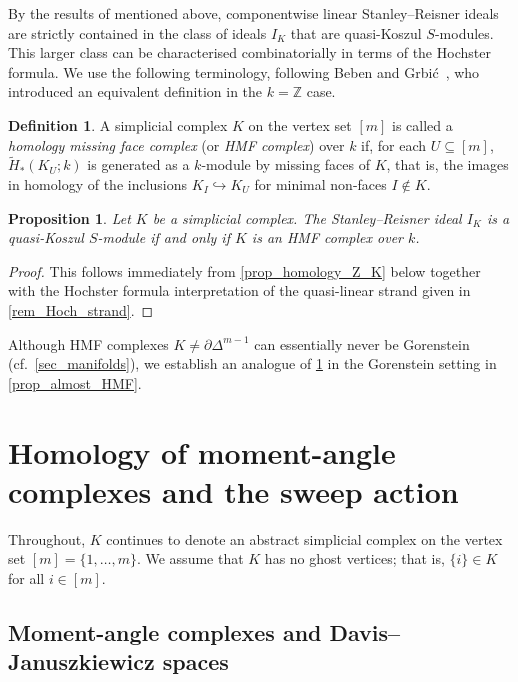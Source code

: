 \documentclass[a4paper,10pt]{amsart}
\newtheorem{proposition}[theorem]{Proposition}
\theoremstyle{definition}
\newtheorem{definition}[theorem]{Definition}
\theoremstyle{remark}
\begin{document}
By the results of \cite{CS} mentioned above, componentwise linear Stanley--Reisner ideals are strictly contained in the class of ideals $I_K$ that are quasi-Koszul $S$-modules. This larger class can be characterised combinatorially in terms of the Hochster formula. We use the following terminology, following Beben and Grbi\'c~\cite{BG}, who introduced an equivalent definition in the $k=\mathbb{Z}$ case.

\begin{definition} \label{def_HMF}
A simplicial complex $K$ on the vertex set $[m]$ is called a \emph{homology missing face complex} (or \emph{HMF complex}) over $k$ if, for each $U\subseteq[m]$, $\widetilde{H}_*(K_U;k)$ is generated as a $k$-module by missing faces of $K$, that is, the images in homology of the inclusions $K_I \hookrightarrow K_U$ for minimal non-faces $I\notin K$.  
\end{definition}

\begin{proposition} \label{prop_HMF}
Let $K$ be a simplicial complex. The Stanley--Reisner ideal $I_K$ is a quasi-Koszul $S$-module if and only if $K$ is an HMF complex over $k$. 
\end{proposition}

\begin{proof}
This follows immediately from \cref{prop_homology_Z_K} below together with the Hochster formula interpretation of the quasi-linear strand given in \cref{rem_Hoch_strand}. 
\end{proof}

Although HMF complexes $K\neq \partial\Delta^{m-1}$ can essentially never be Gorenstein (cf.\ \cref{sec_manifolds}), we establish an analogue of \cref{prop_HMF} in the Gorenstein setting in \cref{prop_almost_HMF}.



\section{Homology of moment-angle complexes and the sweep action} \label{sec_MACs}

Throughout, $K$ continues to denote an abstract simplicial complex on the vertex set $[m]=\{1,\ldots,m\}$. We assume that $K$ has no ghost vertices; that is, $\{i\}\in K$ for all $i\in[m]$.


\subsection*{Moment-angle complexes and Davis--Januszkiewicz spaces}
\end{document}
